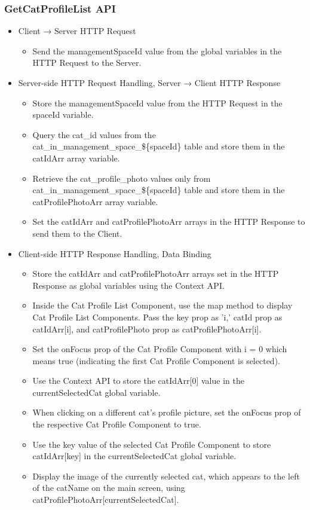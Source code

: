 \documentclass[conference]{IEEEtran}
\begin{document}
\subsubsection{GetCatProfileList API}
\begin{itemize}
    \item Client → Server HTTP Request
    \begin{itemize}
        \item Send the managementSpaceId value from the global variables in the HTTP Request to the Server.
        \\
    \end{itemize}
    \item Server-side HTTP Request Handling, Server → Client HTTP Response
    \begin{itemize}
        \item Store the managementSpaceId value from the HTTP Request in the spaceId variable.
        \item Query the cat\_id values from the cat\_in\_management\_space\_\$\{spaceId\} table and store them in the catIdArr array variable.
        \item Retrieve the cat\_profile\_photo values only from cat\_in\_management\_space\_\$\{spaceId\} table and store them in the catProfilePhotoArr array variable.
        \item Set the catIdArr and catProfilePhotoArr arrays in the HTTP Response to send them to the Client.
        \\
    \end{itemize}
    \item Client-side HTTP Response Handling, Data Binding
    \begin{itemize}
        \item Store the catIdArr and catProfilePhotoArr arrays set in the HTTP Response as global variables using the Context API.
        \item Inside the Cat Profile List Component, use the map method to display Cat Profile List Components. Pass the key prop as 'i,' catId prop as catIdArr[i], and catProfilePhoto prop as catProfilePhotoArr[i].
        \item Set the onFocus prop of the Cat Profile Component with i = 0 which means true (indicating the first Cat Profile Component is selected).
        \item Use the Context API to store the catIdArr[0] value in the currentSelectedCat global variable.
        \item When clicking on a different cat's profile picture, set the onFocus prop of the respective Cat Profile Component to true.
        \item Use the key value of the selected Cat Profile Component to store catIdArr[key] in the currentSelectedCat global variable.
        \item Display the image of the currently selected cat, which appears to the left of the catName on the main screen, using catProfilePhotoArr[currentSelectedCat].
        \\
    \end{itemize}
\end{itemize}
\end{document}
